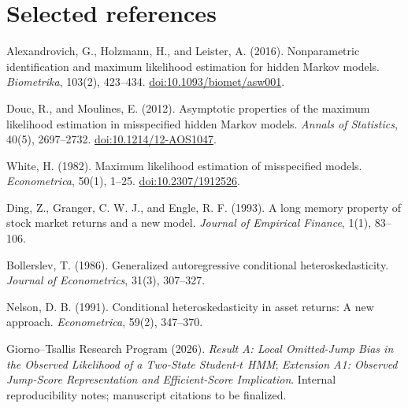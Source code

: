 \documentclass[11pt,a4paper]{article}
\begin{document}
\section*{Selected references}
\begin{enumerate}[leftmargin=2em,label={[\arabic*]}]
\item Alexandrovich, G., Holzmann, H., and Leister, A. (2016). Nonparametric identification and maximum likelihood estimation for hidden Markov models. \emph{Biometrika}, 103(2), 423--434. \href{https://doi.org/10.1093/biomet/asw001}{doi:10.1093/biomet/asw001}.
\item Douc, R., and Moulines, E. (2012). Asymptotic properties of the maximum likelihood estimation in misspecified hidden Markov models. \emph{Annals of Statistics}, 40(5), 2697--2732. \href{https://doi.org/10.1214/12-AOS1047}{doi:10.1214/12-AOS1047}.
\item White, H. (1982). Maximum likelihood estimation of misspecified models. \emph{Econometrica}, 50(1), 1--25. \href{https://doi.org/10.2307/1912526}{doi:10.2307/1912526}.
\item Ding, Z., Granger, C. W. J., and Engle, R. F. (1993). A long memory property of stock market returns and a new model. \emph{Journal of Empirical Finance}, 1(1), 83--106.
\item Bollerslev, T. (1986). Generalized autoregressive conditional heteroskedasticity. \emph{Journal of Econometrics}, 31(3), 307--327.
\item Nelson, D. B. (1991). Conditional heteroskedasticity in asset returns: A new approach. \emph{Econometrica}, 59(2), 347--370.
\item Giorno--Tsallis Research Program (2026). \emph{Result A: Local Omitted-Jump Bias in the Observed Likelihood of a Two-State Student-$t$ HMM}; \emph{Extension A1: Observed Jump-Score Representation and Efficient-Score Implication}. Internal reproducibility notes; manuscript citations to be finalized.
\end{enumerate}
\end{document}

